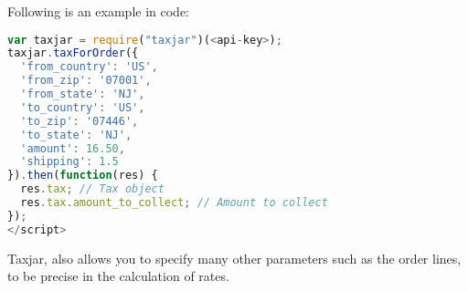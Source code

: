 Following is an example in code:
\begin{lstlisting}[language=javascript]
var taxjar = require("taxjar")(<api-key>);
taxjar.taxForOrder({
  'from_country': 'US',
  'from_zip': '07001',
  'from_state': 'NJ',
  'to_country': 'US',
  'to_zip': '07446',
  'to_state': 'NJ',
  'amount': 16.50,
  'shipping': 1.5
}).then(function(res) {
  res.tax; // Tax object
  res.tax.amount_to_collect; // Amount to collect
});
</script>
\end{lstlisting}
Taxjar, also allows you to specify many other parameters such as the order lines, to be precise in the calculation of rates.